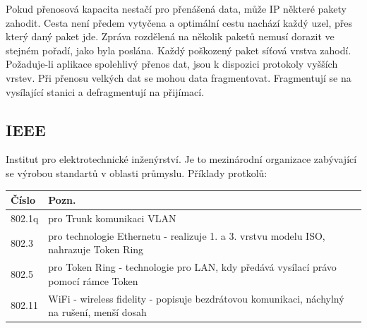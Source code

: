 Pokud přenosová kapacita nestačí pro přenášená data, může IP některé pakety zahodit.
Cesta není předem vytyčena a optimální cestu nachází každý uzel, přes který daný paket jde.
Zpráva rozdělená na několik paketů nemusí dorazit ve stejném pořadí, jako byla poslána.
Každý poškozený paket síťová vrstva zahodí.
Požaduje-li aplikace spolehlivý přenos dat, jsou k dispozici protokoly vyšších vrstev.
Při přenosu velkých dat se mohou data fragmentovat.
Fragmentují se na vysílající stanici a defragmentují na přijímací.
\subsection{IEEE}
Institut pro elektrotechnické inženýrství.
Je to mezinárodní organizace zabývající se výrobou standartů v oblasti průmyslu.
Příklady protkolů: \\
\begin{tabularx}{\linewidth}{l|l}
  \textbf{Číslo} & \textbf{Pozn.}                                                                              \\
  \hline
  802.1q         & pro Trunk komunikaci VLAN                                                                   \\
  \hline
  802.3          & pro technologie Ethernetu - realizuje 1. a 3. vrstvu modelu ISO, nahrazuje Token Ring       \\
  \hline
  802.5          & pro Token Ring - technologie pro LAN, kdy předává vysílací právo pomocí rámce Token         \\
  \hline
  802.11         & WiFi - wireless fidelity - popisuje bezdrátovou komunikaci, náchylný na rušení, menší dosah \\
\end{tabularx}
